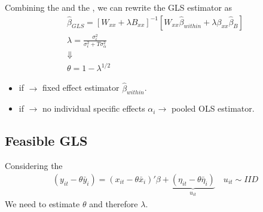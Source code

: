Combining the  and the , we can rewrite the GLS estimator as 
\begin{gather*}
    \hat{\beta}_{GLS} = [W_{xx}+\lambda B_{xx}]^{-1}[W_{xx}\hat{\beta}_{within}+\lambda\beta_{xx}\hat{\beta}_{B}]\\
    \lambda = \frac{\sigma^2_{\epsilon}}{\sigma^2_{\epsilon}+T\sigma^2_{\alpha}}\\
    \Downarrow\\
    \theta = 1 - \lambda^{1/2}
\end{gather*}
\begin{itemize}
    \item if  $\to$ fixed effect estimator $\hat{\beta}_{within}$.
    \item if  $\to$ no individual specific effects $\alpha_i \to$ pooled OLS estimator.
\end{itemize}

\subsection{Feasible GLS}

Considering the 
\begin{gather*}
    (y_{it} - \theta \bar{y}_i) = (x_{it}-\theta\bar{x}_i)'\beta + \underbrace{(\eta_{it} - \theta\bar{\eta}_i)}_{u_{it}}\quad u_{it} \sim IID
\end{gather*}
We need to estimate $\theta$ and therefore $\lambda$.

